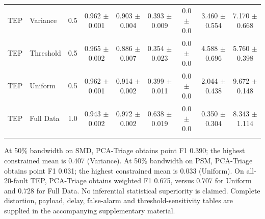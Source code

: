 \begin{table}[p]
{\begin{tabular}{@{}llccccccc@{}}
TEP & Variance & 0.5 & 0.962 $\pm$ 0.001 & 0.903 $\pm$ 0.004 & 0.393 $\pm$ 0.009 & 0.0 $\pm$ 0.0 & 3.460 $\pm$ 0.554 & 7.170 $\pm$ 0.668 \\
TEP & Threshold & 0.5 & 0.965 $\pm$ 0.002 & 0.886 $\pm$ 0.007 & 0.354 $\pm$ 0.023 & 0.0 $\pm$ 0.0 & 4.588 $\pm$ 0.696 & 5.760 $\pm$ 0.398 \\
TEP & Uniform & 0.5 & 0.962 $\pm$ 0.001 & 0.914 $\pm$ 0.002 & 0.399 $\pm$ 0.011 & 0.0 $\pm$ 0.0 & 2.044 $\pm$ 0.438 & 9.672 $\pm$ 0.148 \\
TEP & Full Data & 1.0 & 0.943 $\pm$ 0.002 & 0.972 $\pm$ 0.002 & 0.638 $\pm$ 0.019 & 0.0 $\pm$ 0.0 & 0.350 $\pm$ 0.304 & 8.343 $\pm$ 1.114 \\
\addlinespace
\bottomrule
\end{tabular}%
}
\label{tab:detection}
\end{table}

At 50\% bandwidth on SMD, PCA-Triage obtains point F1 0.390; the highest constrained mean is 0.407 (Variance).
At 50\% bandwidth on PSM, PCA-Triage obtains point F1 0.031; the highest constrained mean is 0.033 (Uniform).
On all-20-fault TEP, PCA-Triage obtains weighted F1 0.675, versus 0.707 for Uniform and 0.728 for Full Data.
No inferential statistical superiority is claimed. Complete distortion, payload, delay, false-alarm and threshold-sensitivity tables are supplied in the accompanying supplementary material.
